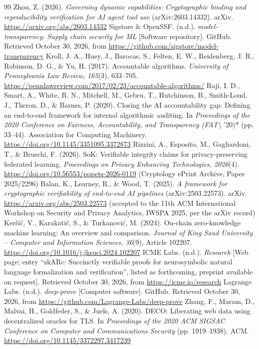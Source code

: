 \documentclass[11pt]{article}
\begin{document}
\begin{thebibliography}{99}
 Zhou, Z. (2026). \emph{Governing dynamic capabilities: Cryptographic binding and reproducibility verification for AI agent tool use} (arXiv:2603.14332). arXiv. \url{https://arxiv.org/abs/2603.14332}
 Sigstore \& OpenSSF. (n.d.). \emph{model-transparency: Supply chain security for ML} [Software repository]. GitHub. Retrieved October 30, 2026, from \url{https://github.com/sigstore/model-transparency}
 Kroll, J. A., Huey, J., Barocas, S., Felten, E. W., Reidenberg, J. R., Robinson, D. G., \& Yu, H. (2017). Accountable algorithms. \emph{University of Pennsylvania Law Review, 165}(3), 633--705. \url{https://pennlawreview.com/2017/02/23/accountable-algorithms/}
 Raji, I. D., Smart, A., White, R. N., Mitchell, M., Gebru, T., Hutchinson, B., Smith-Loud, J., Theron, D., \& Barnes, P. (2020). Closing the AI accountability gap: Defining an end-to-end framework for internal algorithmic auditing. In \emph{Proceedings of the 2020 Conference on Fairness, Accountability, and Transparency (FAT\textbackslash{}} '20)* (pp. 33--44). Association for Computing Machinery. \url{https://doi.org/10.1145/3351095.3372873}
 Rizzini, A., Esposito, M., Gagliardoni, T., \& Bruschi, F. (2026). SoK: Verifiable integrity claims for privacy-preserving federated learning. \emph{Proceedings on Privacy Enhancing Technologies, 2026}(4). \url{https://doi.org/10.56553/popets-2026-0119} (Cryptology ePrint Archive, Paper 2025/2296)
 Balan, K., Learney, R., \& Wood, T. (2025). \emph{A framework for cryptographic verifiability of end-to-end AI pipelines} (arXiv:2503.22573). arXiv. \url{https://arxiv.org/abs/2503.22573} (accepted to the 11th ACM International Workshop on Security and Privacy Analytics, IWSPA 2025, per the arXiv record)
 Ker\v{s}i\v{c}, V., Karakati\v{c}, S., \& Turkanovi\'{c}, M. (2024). On-chain zero-knowledge machine learning: An overview and comparison. \emph{Journal of King Saud University -- Computer and Information Sciences, 36}(9), Article 102207. \url{https://doi.org/10.1016/j.jksuci.2024.102207}
 ICME Labs. (n.d.). \emph{Research} [Web page; entry ``zkARc: Succinctly verifiable proofs for neurosymbolic natural language formalization and verification'', listed as forthcoming, preprint available on request]. Retrieved October 30, 2026, from \url{https://icme.io/research}
 Lagrange Labs. (n.d.). \emph{deep-prove} [Computer software]. GitHub. Retrieved October 30, 2026, from \url{https://github.com/Lagrange-Labs/deep-prove}
 Zhang, F., Maram, D., Malvai, H., Goldfeder, S., \& Juels, A. (2020). DECO: Liberating web data using decentralized oracles for TLS. In \emph{Proceedings of the 2020 ACM SIGSAC Conference on Computer and Communications Security} (pp. 1919--1938). ACM. \url{https://doi.org/10.1145/3372297.3417239}

\end{thebibliography}
\end{document}
